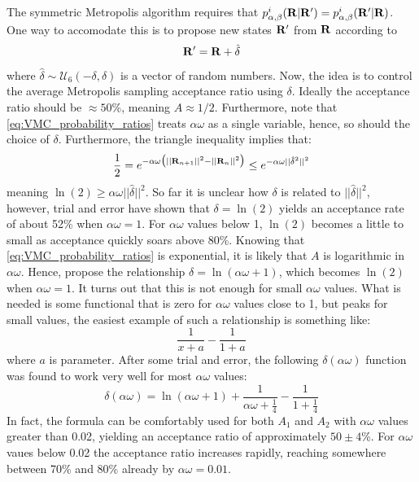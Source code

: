 \documentclass[nofootinbib,reprint,english]{revtex4-1}
\begin{document}
The symmetric Metropolis algorithm requires that \(p_{\alpha,\beta}^i(\vb{R}|\vb{R}')=p_{\alpha,\beta}^i(\vb{R}'|\vb{R})\). One way to accomodate this is to propose new states \(\vb{R}'\) from \(\vb{R}\) according to
\begin{equation}
\vb{R}'=\vb{R}+\hat{\delta}
\end{equation}
where \(\hat{\delta}\sim\mathcal{U}_6(-\delta,\delta)\) is a vector of random numbers. Now, the idea is to control the average Metropolis sampling acceptance ratio using \(\delta\). Ideally the acceptance ratio should be \(\approx50\)\%, meaning \(A\approx1/2\). Furthermore, note that \eqref{eq:VMC_probability_ratios} treats \(\alpha\omega\) as a single variable, hence, so should the choice of \(\delta\). Furthermore, the triangle inequality implies that:
\[\frac{1}{2}=e^{-\alpha\omega\big(||\vb{R}_{n+1}||^2-||\vb{R}_n||^2\big)}\leq e^{-\alpha\omega||\hat{\delta}^2||^2}\]
meaning \(\ln(2)\geq\alpha\omega||\hat{\delta}||^2\). So far it is unclear how \(\delta\) is related to \(||\hat{\delta}||^2\), however, trial and error have shown that \(\delta=\ln(2)\) yields an acceptance rate of about 52\% when \(\alpha\omega=1\). For \(\alpha\omega\) values below 1, \(\ln(2)\) becomes a little to small as acceptance quickly soars above 80\%. Knowing that \eqref{eq:VMC_probability_ratios} is exponential, it is likely that \(A\) is logarithmic in \(\alpha\omega\). Hence, propose the relationship \(\delta=\ln(\alpha\omega+1)\), which becomes \(\ln(2)\) when \(\alpha\omega=1\). It turns out that this is not enough for small \(\alpha\omega\) values. What is needed is some functional that is zero for \(\alpha\omega\) values close to 1, but peaks for small values, the easiest example of such a relationship is something like:
\[\frac{1}{x+a}-\frac{1}{1+a}\]
where \(a\) is parameter. After some trial and error, the following \(\delta(\alpha\omega)\) function was found to work very well for most \(\alpha\omega\) values:
\begin{equation}\label{eq:MC_max_step}
\delta(\alpha\omega)=\ln(\alpha\omega+1)+\frac{1}{\alpha\omega+\frac{1}{4}}-\frac{1}{1+\frac{1}{4}}
\end{equation}
In fact, the formula can be comfortably used for both \(A_1\) and \(A_2\) with \(\alpha\omega\) values greater than 0.02, yielding an acceptance ratio of approximately \(50\pm4\)\%. For \(\alpha\omega\) vaues below 0.02 the acceptance ratio increases rapidly, reaching somewhere between 70\% and 80\%  already by \(\alpha\omega=0.01\).
\end{document}
